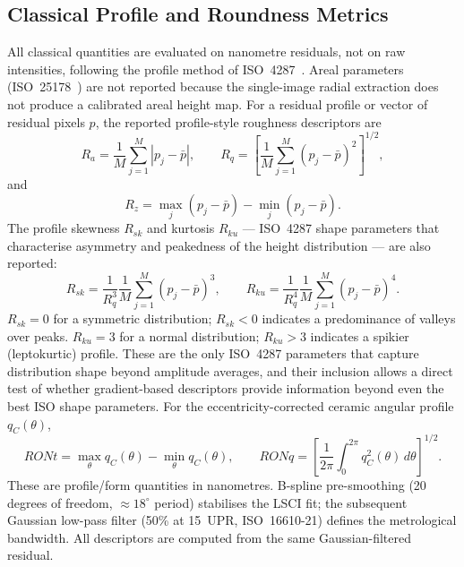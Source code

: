 \documentclass[review]{elsarticle}
\begin{document}
\subsection{Classical Profile and Roundness Metrics}
All classical quantities are evaluated on nanometre residuals, not on raw intensities, following the profile method of ISO~4287~\cite{ISO4287}. Areal parameters (ISO~25178~\cite{ISO25178}) are not reported because the single-image radial extraction does not produce a calibrated areal height map. For a residual profile or vector of residual pixels $p$, the reported profile-style roughness descriptors are
\begin{equation}
R_a=\frac{1}{M}\sum_{j=1}^{M}|p_j-\bar{p}|, \qquad
R_q=\left[\frac{1}{M}\sum_{j=1}^{M}(p_j-\bar{p})^2\right]^{1/2},
\end{equation}
and
\begin{equation}
R_z=\max_j(p_j-\bar{p})-\min_j(p_j-\bar{p}).
\end{equation}
The profile skewness $R_{sk}$ and kurtosis $R_{ku}$ — ISO~4287 shape parameters that characterise asymmetry and peakedness of the height distribution — are also reported:
\begin{equation}
R_{sk}=\frac{1}{R_q^3}\frac{1}{M}\sum_{j=1}^{M}(p_j-\bar{p})^3, \qquad
R_{ku}=\frac{1}{R_q^4}\frac{1}{M}\sum_{j=1}^{M}(p_j-\bar{p})^4.
\end{equation}
$R_{sk}=0$ for a symmetric distribution; $R_{sk}<0$ indicates a predominance of valleys over peaks. $R_{ku}=3$ for a normal distribution; $R_{ku}>3$ indicates a spikier (leptokurtic) profile. These are the only ISO~4287 parameters that capture distribution shape beyond amplitude averages, and their inclusion allows a direct test of whether gradient-based descriptors provide information beyond even the best ISO shape parameters.
For the eccentricity-corrected ceramic angular profile $q_C(\theta)$,
\begin{equation}
RONt=\max_{\theta}q_C(\theta)-\min_{\theta}q_C(\theta), \qquad
RONq=\left[\frac{1}{2\pi}\int_0^{2\pi}q_C^2(\theta)\,d\theta\right]^{1/2}.
\end{equation}
These are profile/form quantities in nanometres. B-spline pre-smoothing (20 degrees of freedom, $\approx 18^\circ$ period) stabilises the LSCI fit; the subsequent Gaussian low-pass filter (50\% at 15~UPR, ISO~16610-21) defines the metrological bandwidth. All descriptors are computed from the same Gaussian-filtered residual.
\end{document}
